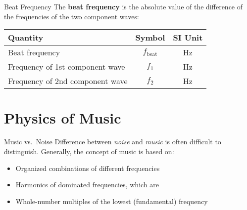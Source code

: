\documentclass[12pt,compress,aspectratio=169]{beamer}
\newcommand{\eq}[2]{\vspace{#1}{\Large\begin{displaymath}#2\end{displaymath}}}
\begin{document}
\begin{frame}{Beat Frequency}
  The \textbf{beat frequency} is the absolute value of the difference of the
  frequencies of the two component waves:

  \eq{-.2in}{
    \boxed{f_\mathrm{beat}=|f_2-f_1|}
  }
  \vspace{-.1in}
  \begin{center}
    \begin{tabular}{l|c|c}
      \rowcolor{pink}
      \textbf{Quantity} & \textbf{Symbol} & \textbf{SI Unit} \\ \hline
      Beat frequency     & $f_\mathrm{beat}$   & \si{\hertz} \\
      Frequency of 1st component wave & $f_1$ & \si{\hertz} \\
      Frequency of 2nd component wave & $f_2$ & \si{\hertz}
    \end{tabular}
  \end{center}
\end{frame}



\section[Music]{Physics of Music}

\begin{frame}{Music vs.\ Noise}
  Difference between \emph{noise} and \emph{music} is often difficult to
  distinguish. Generally, the concept of music is based on:
  \begin{itemize}
  \item Organized combinations of different frequencies
  \item Harmonics of dominated frequencies, which are
  \item Whole-number multiples of the lowest (fundamental) frequency
  \end{itemize}
\end{frame}



%
%
\end{document}
